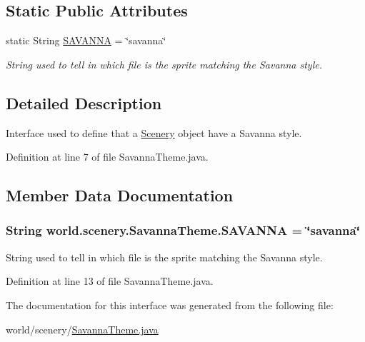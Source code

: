 \subsection*{Static Public Attributes}
\begin{DoxyCompactItemize}
\item 
static String \hyperlink{interfaceworld_1_1scenery_1_1_savanna_theme_a69e8a9867db3a93074a41573940424b2}{S\-A\-V\-A\-N\-N\-A} = \char`\"{}savanna\char`\"{}
\begin{DoxyCompactList}\small\item\em String used to tell in which file is the sprite matching the Savanna style. \end{DoxyCompactList}\end{DoxyCompactItemize}


\subsection{Detailed Description}
Interface used to define that a \hyperlink{classworld_1_1scenery_1_1_scenery}{Scenery} object have a Savanna style. 

Definition at line 7 of file Savanna\-Theme.\-java.



\subsection{Member Data Documentation}
\hypertarget{interfaceworld_1_1scenery_1_1_savanna_theme_a69e8a9867db3a93074a41573940424b2}{
\subsubsection[{S\-A\-V\-A\-N\-N\-A}]{\setlength{\rightskip}{0pt plus 5cm}String world.\-scenery.\-Savanna\-Theme.\-S\-A\-V\-A\-N\-N\-A = \char`\"{}savanna\char`\"{}\hspace{0.3cm}{\ttfamily [static]}}}\label{interfaceworld_1_1scenery_1_1_savanna_theme_a69e8a9867db3a93074a41573940424b2}


String used to tell in which file is the sprite matching the Savanna style. 



Definition at line 13 of file Savanna\-Theme.\-java.



The documentation for this interface was generated from the following file\-:\begin{DoxyCompactItemize}
\item 
world/scenery/\hyperlink{_savanna_theme_8java}{Savanna\-Theme.\-java}\end{DoxyCompactItemize}
